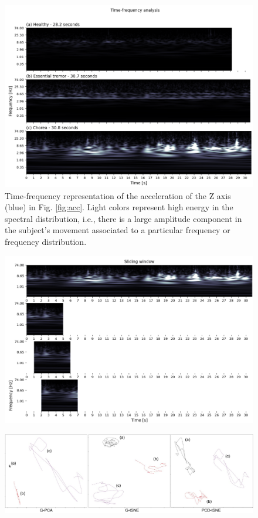\begin{figure}[ht]
\centering
\includegraphics[width=\linewidth]{figures/nemo/freq2.png}
\caption{Time-frequency representation of the acceleration of the Z axis (blue) in Fig. \ref{fig:acc}. Light colors represent high energy in the spectral distribution, i.e., there is a large amplitude component in the subject's movement associated to a particular frequency or frequency distribution.}
\label{fig:freq}
\end{figure}

\begin{figure}[ht]
\centering
\includegraphics[width=\linewidth]{figures/nemo/sliding.png}
\caption{}
\label{fig:sliding}
\end{figure}


\begin{figure}[ht]
\centering
\includegraphics[width=\linewidth]{figures/nemo/nemo1-projections.pdf}
\caption{}
\label{fig:nemo1-projections}
\end{figure}


